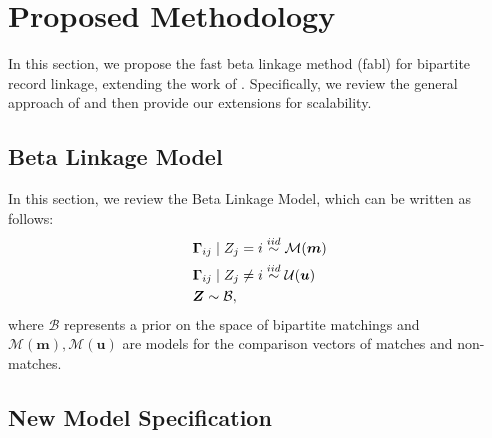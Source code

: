 \documentclass[12pt,letterpaper]{article}
\newcommand{\1}[1]{\mathbb{I}\!\left[#1\right]} %
\begin{document}
\section{Proposed Methodology}
\label{sec:model}

In this section, we propose the fast beta linkage method (fabl) for bipartite record linkage, extending the work of \cite{sadinle_bayesian_2017}.  Specifically, we review the general approach of \cite{sadinle_bayesian_2017} and then provide our extensions for scalability. 


\subsection{Beta Linkage Model}
In this section, we review the Beta Linkage Model, which can be written as follows: 
\begin{align}
&\bm{\Gamma}_{ij} \mid Z_j =i \stackrel{iid}{\sim} \mathcal{M}(\bm{m})  \\
&\bm{\Gamma}_{ij} \mid Z_j \neq i \stackrel{iid}{\sim} \mathcal{U}(\bm{u}) \notag \\
& \bm{Z} \sim \mathcal{B}, \notag
\end{align}
where $\mathcal{B}$ represents a prior on the space of bipartite matchings and $\mathcal{M}(\bm{m}), \mathcal{M}(\bm{u})$ are models for the comparison vectors of matches and non-matches.

\hypertarget{model-specification}{%
	\subsection{New Model Specification}
	\label{model-specification}}
	
\end{document}
